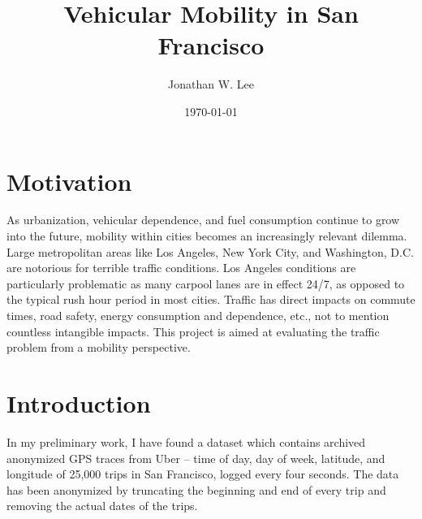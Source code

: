\documentclass[12pt]{article}
\begin{document}

\title{
Vehicular Mobility in San Francisco
}

\author{Jonathan W. Lee}

\date{\today}

\maketitle

\section{Motivation}
As urbanization, vehicular dependence, and fuel consumption continue to grow into the future, mobility within cities becomes an increasingly relevant dilemma. Large metropolitan areas like Los Angeles, New York City, and Washington, D.C. are notorious for terrible traffic conditions. Los Angeles conditions are particularly problematic as many carpool lanes are in effect 24/7, as opposed to the typical rush hour period in most cities. Traffic has direct impacts on commute times, road safety, energy consumption and dependence, etc., not to mention countless intangible impacts. This project is aimed at evaluating the traffic problem from a mobility perspective.

\section{Introduction}

In my preliminary work, I have found a dataset which contains archived anonymized GPS traces from Uber -- time of day, day of week, latitude, and longitude of 25,000 trips in San Francisco, logged every four seconds. The data has been anonymized by truncating the beginning and end of every trip and removing the actual dates of the trips.
\end{document}
